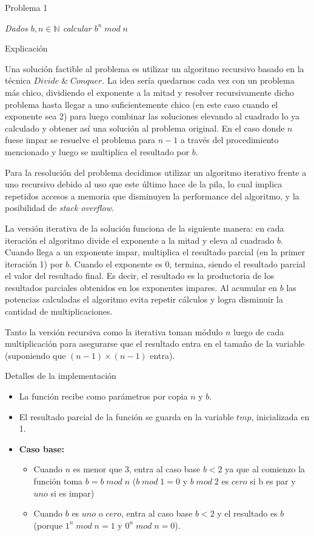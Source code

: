 \begin{section}{Problema 1}

	\textit{Dados $b,n \in \mathbb{N} $ calcular $b^n\; mod\; n$}

	\begin{subsection}{Explicación}

		Una solución factible al problema es utilizar un algoritmo recursivo basado en la técnica $Divide\; \&\; Conquer$. La idea sería quedarnos cada vez con un problema más chico, dividiendo el exponente a la mitad y resolver recursivamente dicho problema hasta llegar a uno suficientemente chico (en este caso cuando el exponente sea 2) para luego combinar las soluciones elevando al cuadrado lo ya calculado y obtener así una solución al problema original. En el caso donde $n$ fuese impar se resuelve el problema para $n-1$ a través del procedimiento mencionado y luego se multiplica el resultado por $b$.

		Para la resolución del problema decidimos utilizar un algoritmo iterativo frente a uno recursivo debido al uso que este último hace de la pila, lo cual implica repetidos accesos a memoria que disminuyen la performance del algoritmo, y la posibilidad de {\em stack overflow}.

		La versión iterativa de la solución funciona de la siguiente manera: en cada iteración el algoritmo divide el exponente a la mitad y eleva al cuadrado $b$. Cuando llega a un exponente impar, multiplica el resultado parcial (en la primer iteración 1) por $b$. Cuando el exponente es 0, termina, siendo el resultado parcial el valor del resultado final. Es decir, el resultado es la productoria de los resultados parciales obtenidos en los exponentes impares. Al acumular en $b$ las potencias calculadas el algoritmo evita repetir cálculos y logra disminuir la cantidad de multiplicaciones.

		Tanto la versión recursiva como la iterativa toman módulo $n$ luego de cada multiplicación para asegurarse que el resultado entra en el tamaño de la variable (suponiendo que $(n-1)\times (n-1)$ entra).
	\end{subsection}
	
	\begin{subsection}{Detalles de la implementación}
		\begin{itemize}
			\item La función recibe como parámetros por copia $n$ y $b$.
			\item El resultado parcial de la función se guarda en la variable $tmp$, inicializada en 1.
			\item \textbf{Caso base:} 
			\begin{itemize}
				\item Cuando $n$ es menor que 3, entra al caso base $b<2$ ya que al comienzo la función toma $b=b\;mod\; n$ ($b\; mod\; 1 = 0$ y $b\; mod\; 2$  es $cero$ si b es par y $uno$ si es impar) 
				\item Cuando $b$ es $uno$ o $cero$, entra al caso base $b<2$ y el resultado es $b$ (porque $1^n\;mod\;n=1$ y $0^n\;mod\;n=0$).
			\end{itemize}


\end{itemize}
\end{subsection}
\end{section}
